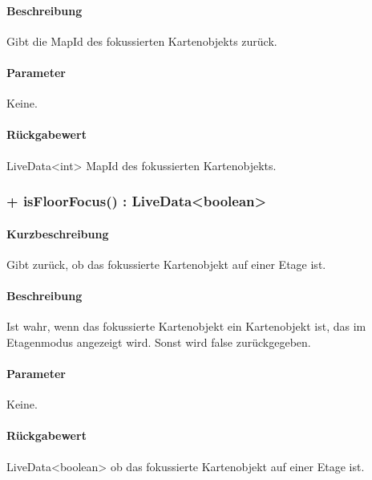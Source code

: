 \paragraph*{Beschreibung}
Gibt die MapId des fokussierten Kartenobjekts zurück.
\paragraph*{Parameter}
Keine.
\paragraph*{Rückgabewert}
LiveData<int> MapId des fokussierten Kartenobjekts.

\subsubsection{+ isFloorFocus() : LiveData<boolean>}%
\paragraph*{Kurzbeschreibung}
Gibt zurück, ob das fokussierte Kartenobjekt auf einer Etage ist.
\paragraph*{Beschreibung}
Ist wahr, wenn das fokussierte Kartenobjekt ein Kartenobjekt ist, das im Etagenmodus 
angezeigt wird. Sonst wird false zurückgegeben.
\paragraph*{Parameter}
Keine.
\paragraph*{Rückgabewert}
LiveData<boolean> ob das fokussierte Kartenobjekt auf einer Etage ist.